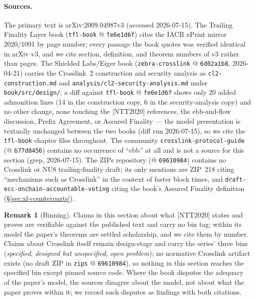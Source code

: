 \documentclass[11pt,a4paper]{article}
\theoremstyle{definition}
\newtheorem{remark}[theorem]{Remark}
\begin{document}
\paragraph{Sources.} The primary text is arXiv:2009.04987v3 (accessed
2026-07-15). The Trailing Finality Layer book (\texttt{tfl-book} @
\texttt{fe6e1d6f}) cites the IACR ePrint mirror 2020/1091 by page number;
every passage the book quotes was verified identical in arXiv v3, and we
cite section, definition, and theorem numbers of v3 rather than pages.
The Shielded Labs/Eiger book (\texttt{zebra-crosslink} @ \texttt{6d02a1b8},
2026-04-21) carries the Crosslink~2 construction and security analysis as
\texttt{cl2-construction.md} and
\texttt{analysis/cl2-security-analysis.md} under
\texttt{book/src/design/}; a diff against
\texttt{tfl-book} @ \texttt{fe6e1d6f} shows only 20 added admonition
lines (14 in the construction copy, 6 in the security-analysis copy) and
no other change, none touching
the [NTT2020] references, the ebb-and-flow discussion, Prefix Agreement, or
Assured Finality --- the model presentation is textually unchanged between
the two books (diff run 2026-07-15), so we cite the \texttt{tfl-book}
chapter files throughout. The community
\texttt{crosslink-protocol-guide} (@ \texttt{b77d8456}) contains no
occurrence of ``ebb'' at all and is not a source for this section (grep,
2026-07-15). The ZIPs repository (@ \texttt{69610984}) contains no
Crosslink or NU8 trailing-finality draft; its only mentions are ZIP~218
citing ``mechanisms such as Crosslink'' in the context of faster block
times, and \texttt{draft-ecc-onchain-accountable-voting} citing the
book's Assured Finality definition (\S\ref{sec:xl-counterparts}).

\begin{remark}[Binning]\label{rem:xl-model-bins}
Claims in this section about what [NTT2020] states and proves are
verifiable against the published text and carry no bin tag; within its
model the paper's theorems are settled scholarship, and we cite them by
number. Claims about Crosslink itself remain design-stage and carry the
series' three bins (\emph{specified}, \emph{designed but unspecified},
\emph{open problem}); no normative Crosslink artifact exists (no draft ZIP
in \texttt{zips} @ \texttt{69610984}), so nothing in this section reaches
the specified bin except pinned source code. Where the book disputes the
adequacy of the paper's model, the sources disagree about the model, not
about what the paper proves within it; we record such disputes as findings
with both citations.
\end{remark}
\end{document}
